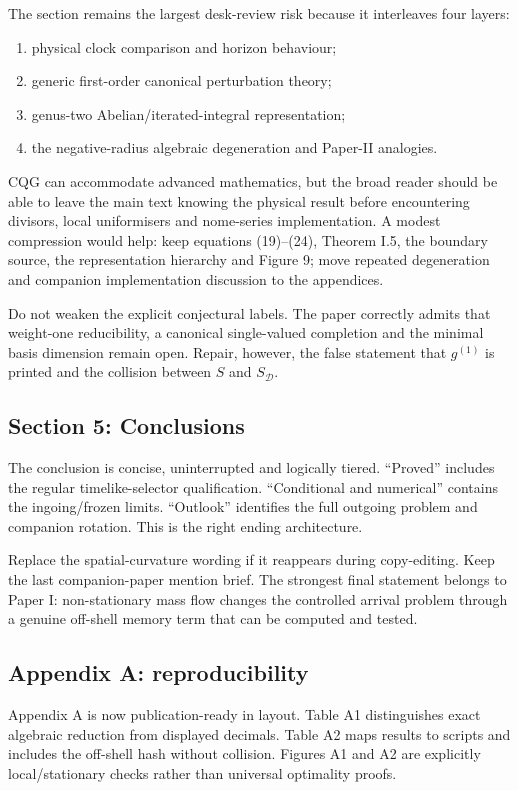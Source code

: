 \documentclass[11pt,a4paper]{article}
\newcommand{\SD}{S_{\mathcal D}}
\begin{document}
The section remains the largest desk-review risk because it interleaves four layers:
\begin{enumerate}
  \item physical clock comparison and horizon behaviour;
  \item generic first-order canonical perturbation theory;
  \item genus-two Abelian/iterated-integral representation;
  \item the negative-radius algebraic degeneration and Paper-II analogies.
\end{enumerate}
CQG can accommodate advanced mathematics, but the broad reader should be able to leave the
main text knowing the physical result before encountering divisors, local uniformisers and
nome-series implementation. A modest compression would help: keep equations (19)--(24),
Theorem I.5, the boundary source, the representation hierarchy and Figure 9; move repeated
degeneration and companion implementation discussion to the appendices.

Do not weaken the explicit conjectural labels. The paper correctly admits that weight-one
reducibility, a canonical single-valued completion and the minimal basis dimension remain open.
Repair, however, the false statement that $g^{(1)}$ is printed and the collision between $S$ and
$\SD$.

\subsection{Section 5: Conclusions}

The conclusion is concise, uninterrupted and logically tiered. ``Proved'' includes the regular
timelike-selector qualification. ``Conditional and numerical'' contains the ingoing/frozen
limits. ``Outlook'' identifies the full outgoing problem and companion rotation. This is the
right ending architecture.

Replace the spatial-curvature wording if it reappears during copy-editing. Keep the last
companion-paper mention brief. The strongest final statement belongs to Paper I: non-stationary
mass flow changes the controlled arrival problem through a genuine off-shell memory term that
can be computed and tested.

\subsection{Appendix A: reproducibility}

Appendix A is now publication-ready in layout. Table A1 distinguishes exact algebraic reduction
from displayed decimals. Table A2 maps results to scripts and includes the off-shell hash without
collision. Figures A1 and A2 are explicitly local/stationary checks rather than universal
optimality proofs.
\end{document}
